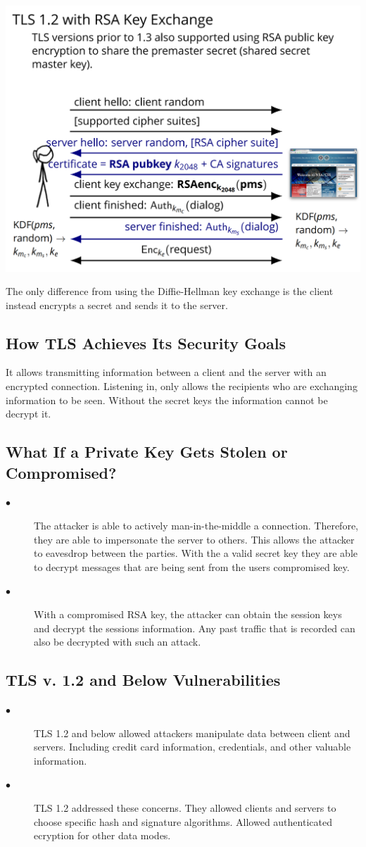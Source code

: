 \documentclass[11pt]{article} %
\begin{document}
\includegraphics[scale=.6]{./TLS_RSA.png}

The only difference from using the Diffie-Hellman key exchange is the client 
instead encrypts a secret and sends it to the server.

\newpage
\subsection{How TLS Achieves Its Security Goals}
It allows transmitting information between a client and the server with an encrypted connection. Listening in, only allows the recipients who are exchanging information to be seen. Without the secret keys the information cannot be decrypt it.
\subsection{What If a Private Key Gets Stolen or Compromised?}
\begin{description}
  \item[$\bullet$] The attacker is able to actively man-in-the-middle a connection. Therefore, they are able to impersonate the server to others. This allows the attacker to eavesdrop between the parties. With the a valid secret key they are able to decrypt messages that are being sent from the users compromised key.
  \item[$\bullet$] With a compromised RSA key, the attacker can obtain the session keys and decrypt the sessions information. Any past traffic that is recorded can also be decrypted with such an attack.
\end{description}
\subsection{TLS v. 1.2 and Below Vulnerabilities}
\begin{description}
  \item[$\bullet$] TLS 1.2 and below allowed attackers manipulate data between client and servers. Including credit card information, credentials, and other valuable information. 
  \item[$\bullet$] TLS 1.2 addressed these concerns. They allowed clients and servers to choose specific hash and signature algorithms. Allowed authenticated ecryption for other data modes.
  \end{description}
\end{document}
